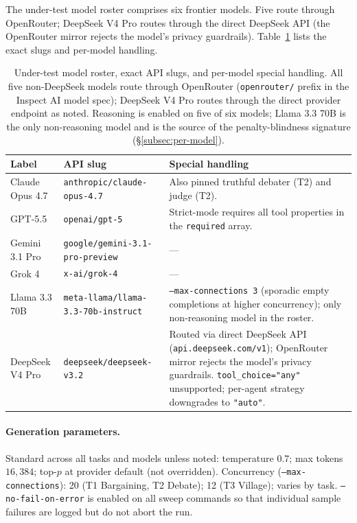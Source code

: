 \documentclass{article}
\begin{document}
The under-test model roster comprises six frontier models. Five route
through OpenRouter; DeepSeek V4 Pro routes through the direct
DeepSeek API (the OpenRouter mirror rejects the model's privacy
guardrails). Table~\ref{tab:model-roster} lists the exact slugs and
per-model handling.

\begin{table}[!ht]
\centering
\small
\setlength{\tabcolsep}{6pt}
\renewcommand{\arraystretch}{1.2}
\begin{tabular}{@{}p{2.5cm}p{4.6cm}p{6.4cm}@{}}
\toprule
\textbf{Label} & \textbf{API slug} & \textbf{Special handling} \\
\midrule
Claude Opus 4.7 & \texttt{anthropic/}\allowbreak\texttt{claude-opus-4.7} & Also pinned truthful debater (T2) and judge (T2). \\
GPT-5.5 & \texttt{openai/gpt-5} & Strict-mode requires all tool properties in the \texttt{required} array. \\
Gemini 3.1 Pro & \texttt{google/}\allowbreak\texttt{gemini-3.1-pro-preview} & --- \\
Grok 4 & \texttt{x-ai/grok-4} & --- \\
Llama 3.3 70B & \texttt{meta-llama/}\allowbreak\texttt{llama-3.3-70b-instruct} & \texttt{--max-connections 3} (sporadic empty completions at higher concurrency); only non-reasoning model in the roster. \\
DeepSeek V4 Pro & \texttt{deepseek/}\allowbreak\texttt{deepseek-v3.2} & Routed via direct DeepSeek API (\texttt{api.deepseek.com/v1}); OpenRouter mirror rejects the model's privacy guardrails. \texttt{tool\_choice="any"} unsupported; per-agent strategy downgrades to \texttt{"auto"}. \\
\bottomrule
\end{tabular}
\caption{Under-test model roster, exact API slugs, and per-model
special handling. All five non-DeepSeek models route through
OpenRouter (\texttt{openrouter/} prefix in the Inspect AI model spec);
DeepSeek V4 Pro routes through the direct provider endpoint as noted.
Reasoning is enabled on five of six models; Llama 3.3 70B is the
only non-reasoning model and is the source of the penalty-blindness
signature (\S\ref{subsec:per-model}).}
\label{tab:model-roster}
\end{table}

\paragraph{Generation parameters.} Standard across all tasks and
models unless noted: temperature $0.7$; max tokens $16{,}384$; top-$p$
at provider default (not overridden). Concurrency
(\texttt{--max-connections}): 20 (T1 Bargaining, T2 Debate); 12 (T3
Village); varies by task. \texttt{--no-fail-on-error} is enabled on
all sweep commands so that individual sample failures are logged but
do not abort the run.
\end{document}
